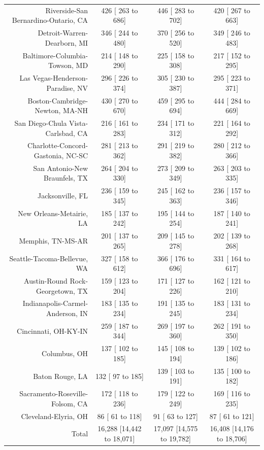 \documentclass{article}
\begin{document}
\begin{table}[H]
\begin{tabular}{|r|c|c|c|}
		Riverside-San Bernardino-Ontario, CA &    426 [   263 to    686] &    446 [   283 to    702] &    420 [   267 to    663]\\
		Detroit-Warren-Dearborn, MI &    346 [   244 to    480] &    370 [   256 to    520] &    349 [   246 to    483]\\
		Baltimore-Columbia-Towson, MD &    214 [   148 to    290] &    225 [   158 to    308] &    217 [   152 to    295]\\
		Las Vegas-Henderson-Paradise, NV &    296 [   226 to    374] &    305 [   230 to    387] &    295 [   223 to    371]\\
		Boston-Cambridge-Newton, MA-NH &    430 [   270 to    670] &    459 [   295 to    694] &    444 [   284 to    669]\\
		San Diego-Chula Vista-Carlsbad, CA &    216 [   161 to    283] &    234 [   171 to    312] &    221 [   164 to    292]\\
		Charlotte-Concord-Gastonia, NC-SC &    281 [   213 to    362] &    291 [   219 to    382] &    280 [   212 to    366]\\
		San Antonio-New Braunfels, TX &    264 [   204 to    330] &    273 [   209 to    349] &    263 [   203 to    335]\\
		Jacksonville, FL &    236 [   159 to    345] &    245 [   162 to    363] &    236 [   157 to    346]\\
		New Orleans-Metairie, LA &    185 [   137 to    242] &    195 [   144 to    254] &    187 [   140 to    241]\\
		Memphis, TN-MS-AR &    201 [   137 to    265] &    209 [   145 to    278] &    202 [   139 to    268]\\
		Seattle-Tacoma-Bellevue, WA &    327 [   158 to    612] &    366 [   176 to    696] &    331 [   164 to    617]\\
		Austin-Round Rock-Georgetown, TX &    159 [   123 to    204] &    171 [   127 to    226] &    162 [   121 to    210]\\
		Indianapolis-Carmel-Anderson, IN &    183 [   135 to    234] &    191 [   135 to    245] &    183 [   131 to    234]\\
		Cincinnati, OH-KY-IN &    259 [   187 to    344] &    269 [   197 to    360] &    262 [   191 to    350]\\
		Columbus, OH &    137 [   102 to    185] &    145 [   108 to    194] &    139 [   102 to    186]\\
		Baton Rouge, LA &    132 [    97 to    185] &    139 [   103 to    191] &    135 [   100 to    182]\\
		Sacramento-Roseville-Folsom, CA &    172 [   118 to    236] &    179 [   122 to    249] &    169 [   116 to    235]\\
		Cleveland-Elyria, OH &     86 [    61 to    118] &     91 [    63 to    127] &     87 [    61 to    121]\\
		\hline
		Total & 16,288 [14,442 to 18,071] & 17,097 [14,575 to 19,782] & 16,408 [14,176 to 18,706]\\
		
		\hline
	\end{tabular}
\end{table}
\end{document}
